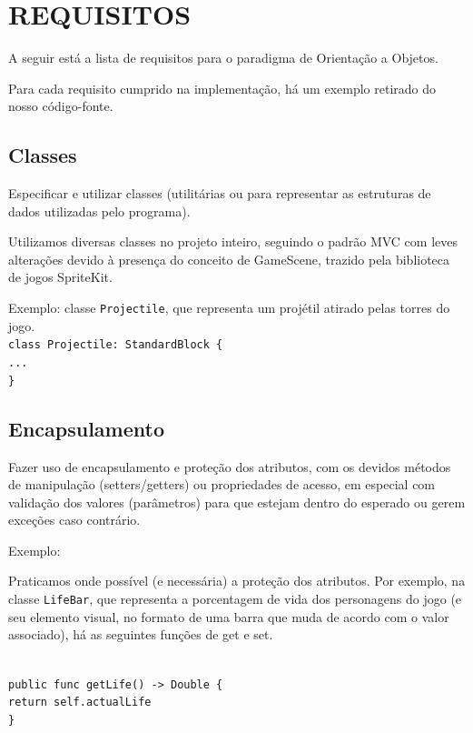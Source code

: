 \documentclass[rel_mlp]{iiufrgs}
\newcommand\tab[1][1cm]{\hspace*{#1}}
\begin{document}

\chapter{REQUISITOS} \label{intro}

A seguir está a lista de requisitos para o paradigma de Orientação a Objetos.

Para cada requisito cumprido na implementação, há um exemplo retirado do nosso código-fonte.


\section{Classes}

Especificar e utilizar classes (utilitárias ou para representar as estruturas de dados utilizadas pelo programa).

Utilizamos diversas classes no projeto inteiro, seguindo o padrão MVC com leves alterações devido à presença do conceito de GameScene, trazido pela biblioteca de jogos SpriteKit.

Exemplo: classe \texttt{Projectile}, que representa um projétil atirado pelas torres do jogo.
\texttt{\\class Projectile: StandardBlock \{\\\tab ...\\\}}


\section{Encapsulamento}

Fazer uso de encapsulamento e proteção dos atributos, com os devidos métodos de manipulação (setters/getters) ou propriedades de acesso, em especial com validação dos valores (parâmetros) para que estejam dentro do esperado ou gerem exceções caso contrário.

Exemplo:

Praticamos onde possível (e necessária) a proteção dos atributos. Por exemplo, na classe \texttt{LifeBar}, que representa a porcentagem de vida dos personagens do jogo (e seu elemento visual, no formato de uma barra que muda de acordo com o valor associado), há as seguintes funções de get e set.

\texttt{\\public func getLife() -> Double \{\\\tab return self.actualLife\\\}}
\end{document}
